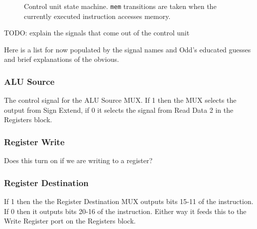 \begin{figure}[h]
    \begin{center}
            \caption{
                Control unit state machine.
                \texttt{mem} transitions are taken when the currently executed instruction accesses memory.
            }
            \label{figure:control-unit-state-machine}
    \end{center}
\end{figure}

TODO: explain the signals that come out of the control unit

Here is a list for now populated by the signal names and Odd's educated guesses and brief explanations of the obvious.

\subsubsection{ALU Source}
The control signal for the ALU Source MUX. If 1 then the MUX selects the output from Sign Extend, if 0 it selects the signal from Read Data 2 in the Registers block.

\subsubsection{Register Write}
Does this turn on if we are writing to a register?

\subsubsection{Register Destination}
If 1 then the the Register Destination MUX outputs bits 15-11 of the instruction. If 0 then it outputs bits 20-16 of the instruction. Either way it feeds this to the Write Register port on the Registers block.

